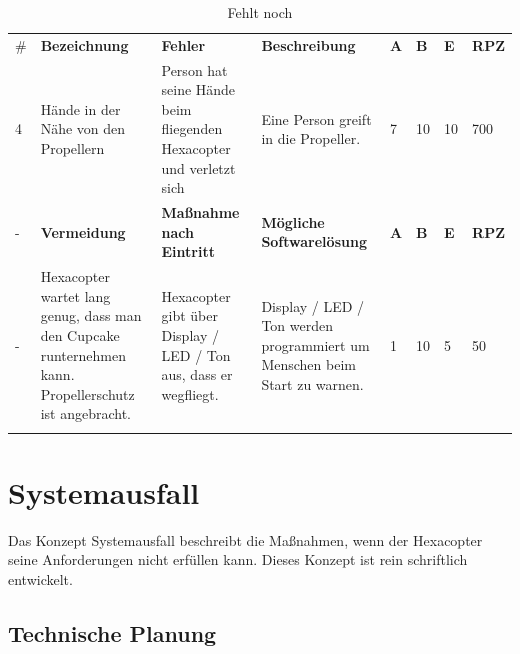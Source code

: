 \begin{longtable}{|p{0.4cm}|p{3.0cm}|p{3.1cm}|p{3.1cm}|p{0.4cm}|p{0.4cm}|p{0.4cm}|p{0.8cm}|}
\hline \#   & \textbf{Bezeichnung}                                                                                               & \textbf{Fehler}                                                                                                                & \textbf{Beschreibung}                                                                                                                    & \textbf{A}   & \textbf{B}   & \textbf{E}   & \textbf{RPZ} \\
 4          & Hände in der Nähe von den Propellern                                                                      & Person hat seine Hände beim fliegenden Hexacopter und verletzt sich                                                   & Eine Person greift in die Propeller.                                                                                            & 7   & 10  & 10  & 700 \\
\hline -    & \textbf{Vermeidung}                                                                                                & \textbf{Maßnahme nach Eintritt}                                                                                                & \textbf{Mögliche Softwarelösung}                                                                                                         & \textbf{A}   & \textbf{B}   & \textbf{E}   & \textbf{RPZ} \\
 -          & Hexacopter wartet lang genug, dass man den Cupcake runternehmen kann. Propellerschutz ist angebracht.     & Hexacopter gibt über Display / LED / Ton aus, dass er wegfliegt.                                                      & Display / LED / Ton werden programmiert um Menschen beim Start zu warnen.                                                       & 1   & 10  & 5   & 50  \\\hline
 \caption{Fehlt noch}
\end{longtable}


\section{Systemausfall}

Das Konzept Systemausfall beschreibt die Maßnahmen, wenn der Hexacopter seine Anforderungen nicht erfüllen kann. Dieses Konzept ist rein schriftlich entwickelt.

  \subsection{Technische Planung}

